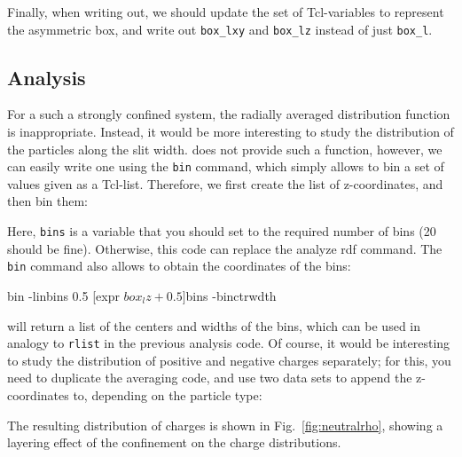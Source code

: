 \documentclass[
a4paper,                        %
11pt,                           %
twoside,                        %
footsepline,                    %
headsepline,                    %
headexclude,                    %
footexclude,                    %
pagesize,                       %
]{scrartcl}
\begin{document}
Finally, when writing out, we should update the set of
Tcl-variables to represent the asymmetric box, and write out
\verb|box_lxy| and \verb|box_lz| instead of just \verb|box_l|.

\subsection*{Analysis}

For a such a strongly confined system, the radially averaged
distribution function is inappropriate. Instead, it would be more
interesting to study the distribution of the particles along the slit
width. \es{}  does not provide such a function, however, we can easily
write one using the \verb|bin| command, which simply allows to bin a
set of values given as a Tcl-list. Therefore, we first create the list
of z-coordinates, and then bin them:


Here, \verb|bins| is a variable that you should set to the required
number of bins (20 should be fine). Otherwise, this code can replace
the analyze rdf command. The \verb|bin| command also allows to obtain
the coordinates of the bins:

\begin{tclcode}
  bin -linbins 0.5 [expr $box_lz + 0.5] $bins -binctrwdth
\end{tclcode}

will return a list of the centers and widths of the bins, which can be
used in analogy to \verb|rlist| in the previous analysis code. Of
course, it would be interesting to study the distribution of positive
and negative charges separately; for this, you need to duplicate the
averaging code, and use two data sets to append the z-coordinates to,
depending on the particle type:


The resulting distribution of charges is shown in
Fig.~\ref{fig:neutralrho}, showing a layering effect of the
confinement on the charge distributions.
\end{document}
